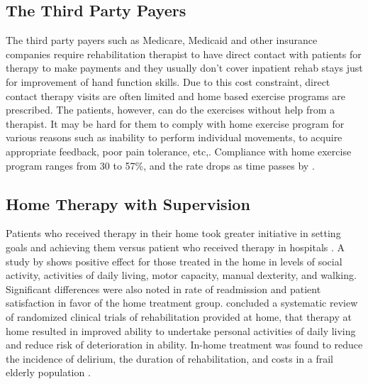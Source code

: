 \documentclass[12pt]{article}
\begin{document}
\subsection{The Third Party Payers}
The third party payers such as Medicare, Medicaid and other insurance companies require rehabilitation therapist to have direct contact with patients for therapy to make payments \cite{mccarty2002telehealth} and they usually don't cover inpatient rehab stays just for improvement of hand function skills. Due to this cost constraint, direct contact therapy visits are often limited and home based exercise programs are prescribed. The patients, however, can do the exercises without help from a therapist. It may be hard for them to comply with home exercise program for various reasons such as inability to perform individual movements, to acquire appropriate feedback, poor pain tolerance, etc,. Compliance with home exercise program ranges from 30 to 57\%, and the rate drops as time passes by \cite{sluijs1991patient}. %
\medskip

\subsection{Home Therapy with Supervision}
 Patients who received therapy in their home took greater initiative in setting goals and achieving them versus patient who received therapy in hospitals \citet{koch1998rehabilitation}. A study by \citeauthor{holmqvist1998randomized} shows positive effect for those treated in the home in levels of social activity, activities of daily living, motor capacity, manual dexterity, and walking. Significant differences were also noted in rate of readmission and patient satisfaction in favor of the home treatment group.  \citet{legg2004rehabilitation} concluded a systematic review of randomized clinical trials of rehabilitation provided at home, that therapy at home resulted in improved ability to undertake personal activities of daily living and reduce risk of deterioration in ability. In-home treatment was found to reduce the incidence of delirium, the duration of rehabilitation, and costs in a frail elderly population \cite{caplan2005does}.
 
\end{document}

